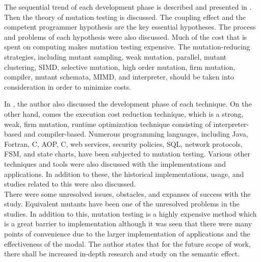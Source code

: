 The sequential trend of each development phase is described and presented in \cite{ref25}. Then the theory of mutation testing is discussed. The coupling effect and the competent programmer hypothesis are the key essential hypotheses. The process and problems of each hypothesis were also discussed. Much of the cost that is spent on computing makes mutation testing expensive. The mutation-reducing strategies, including mutant sampling, weak mutation, parallel, mutant clustering, SIMD, selective mutation, high order mutation, firm mutation, compiler, mutant schemata, MIMD, and interpreter, should be taken into consideration in order to minimize costs.\par 
In \cite{ref26}, the author also discussed the development phase of each technique. On the other hand, comes the execution cost reduction technique, which is a strong, weak, firm mutation, runtime optimization technique consisting of interpreter-based and compiler-based. Numerous programming languages, including Java, Fortran, C, AOP, C, web services, security policies, SQL, network protocols, FSM, and state charts, have been subjected to mutation testing. Various other techniques and tools were also discussed with the implementations and applications. In addition to these, the historical implementations, usage, and studies related to this were also discussed. \\

There were some unresolved issues, obstacles, and expanses of success with the study. Equivalent mutants have been one of the unresolved problems in the studies. In addition to this, mutation testing is a highly expensive method which is a great barrier to implementation although it was seen that there were many points of convenience due to the larger implementation of applications and the effectiveness of the modal. The author states that for the future scope of work, there shall be increased in-depth research and study on the semantic effect.
